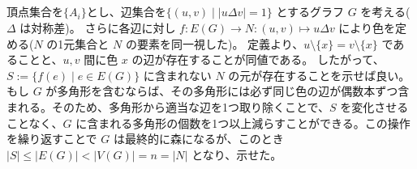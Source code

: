 \subsection{}
頂点集合を$\{A_i\}$とし、辺集合を$\{(u,v)\mid |u \Delta v|=1\}$ とするグラフ $G$ を考える($\Delta$ は対称差)。
さらに各辺に対し $f:E(G)\to N: (u,v) \mapsto u\Delta v$ により色を定める($N$ の1元集合と $N$ の要素を同一視した)。
定義より、$u\setminus \{x\}=v\setminus \{x\}$ であることと、$u,v$ 間に色 $x$ の辺が存在することが同値である。
したがって、$S:=\{f(e) \mid e\in E(G)\}$ に含まれない $N$ の元が存在することを示せば良い。
もし $G$ が多角形を含むならば、その多角形には必ず同じ色の辺が偶数本ずつ含まれる。そのため、多角形から適当な辺を1つ取り除くことで、$S$ を変化させることなく、$G$ に含まれる多角形の個数を1つ以上減らすことができる。この操作を繰り返すことで $G$ は最終的に森になるが、このとき $|S|\leq |E(G)|<|V(G)|=n=|N|$ となり、示せた。
